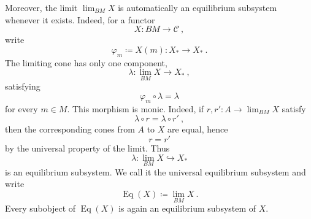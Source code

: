 \documentclass[a4paper,reqno,oneside]{amsart}
\theoremstyle{definition}
\theoremstyle{remark}
\numberwithin{equation}{section}
\begin{document}
	Moreover, the limit $\lim_{BM}X$ is automatically an equilibrium subsystem
	whenever it exists. Indeed, for a functor
	\begin{equation}
		X\colon BM\to\mathcal C \ ,
	\end{equation}
	write
	\begin{equation}
		\varphi_m\coloneqq X(m)\colon X_*\to X_* \ .
	\end{equation}
	The limiting cone has only one component,
	\begin{equation}
		\lambda\colon \lim_{BM}X\longrightarrow X_* \ ,
	\end{equation}
	satisfying
	\begin{equation}
		\varphi_m\circ \lambda=\lambda
	\end{equation}
	for every $m\in M$. This morphism is monic. Indeed, if
	$r,r'\colon A\to \lim_{BM}X$ satisfy
	\begin{equation}
		\lambda\circ r=\lambda\circ r' \ ,
	\end{equation}
	then the corresponding cones from $A$ to $X$ are equal, hence
	\begin{equation}
		r=r'
	\end{equation}
	by the universal property of the limit. Thus
	\begin{equation}
		\lambda\colon \lim_{BM}X\hookrightarrow X_*
	\end{equation}
	is an equilibrium subsystem. We call it the universal equilibrium subsystem
	and write
	\begin{equation}
		\operatorname{Eq}(X)\coloneqq \lim_{BM}X \ .
	\end{equation}
	Every subobject of $\operatorname{Eq}(X)$ is again an equilibrium subsystem
	of $X$.
	
	
	
\end{document}
